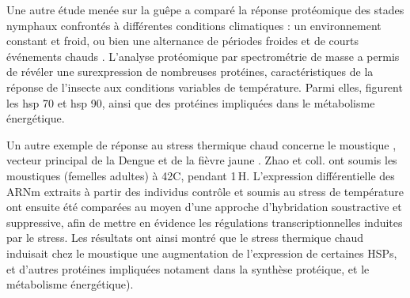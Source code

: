 		Une autre étude menée sur la guêpe  a comparé la réponse protéomique des stades nymphaux confrontés à différentes conditions climatiques : un environnement constant et froid, ou bien une alternance de périodes froides et de courts événements chauds \cite{colinet2007}.
		L'analyse protéomique par spectrométrie de masse a  permis de révéler une surexpression de nombreuses protéines, caractéristiques de la réponse de l'insecte aux conditions variables de température. Parmi elles, figurent les hsp 70 et hsp 90,
		ainsi que des protéines impliquées dans le métabolisme énergétique.


		Un autre exemple de réponse au stress thermique chaud concerne le moustique , vecteur principal de la Dengue et de la fièvre jaune \cite{zhao2009}. Zhao et coll. ont soumis les moustiques (femelles adultes) à 42\textdegree{}C, pendant 1\,H.
		L'expression différentielle des ARNm extraits à partir des individus contrôle et soumis au stress de température ont ensuite été comparées au moyen d'une approche d'hybridation soustractive et suppressive, afin de mettre en évidence les régulations transcriptionnelles induites par le stress.
		Les résultats ont ainsi montré que le stress thermique chaud induisait chez le moustique
		une augmentation de l'expression de certaines HSPs, et d'autres protéines impliquées notament dans la synthèse protéique, et le métabolisme énergétique).

